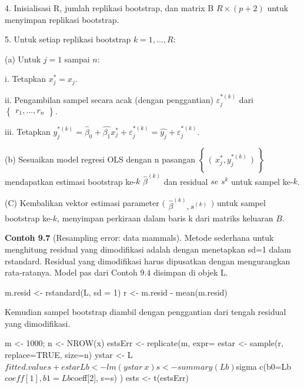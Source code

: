 \documentclass[a4paper,12pt]{article}
\theoremstyle{definition}
\begin{document}
4. Inisialisasi R, jumlah replikasi bootstrap, dan matrix B $R \times (p+2)$ untuk menyimpan replikasi bootstrap.

5. Untuk setiap replikasi bootstrap $k = 1,...,R:$ 

    (a) Untuk $j=1$ sampai $n:$ 
    
        i. Tetapkan $x_{j}^{*} = x_{j}.$
        
        ii. Pengambilan sampel secara acak (dengan penggantian) $\varepsilon _{j}^{*(k)}$ dari $\begin{Bmatrix}
        r_{1},...,r_{n}
        \end{Bmatrix}.$

        iii. Tetapkan $y_{j}^{*(k)} = \widehat{\beta }_{0} + \widehat{\beta _{1}}x_{j}^{*} + \varepsilon _{j}^{*(k)} =\widehat{y_{j}} + \varepsilon _{j}^{*(k)}.$ 

    (b) Sesuaikan model regresi OLS dengan n pasangan  
     $\begin{Bmatrix}
        \bigl(\begin{smallmatrix}
        x_{j}^{*}, y _{j}^{*(k)}
        \end{smallmatrix}\bigr)
    \end{Bmatrix}$
        mendapatkan estimasi bootstrap ke-$k$ $\widehat{\beta } ^{(k)}$ dan residual $se$ $s^{k}$ untuk sampel ke-$k$.

    (C) Kembalikan vektor estimasi parameter $\bigl(\begin{smallmatrix}
        \widehat{\beta }^{(k)}, s^{(k)}
        \end{smallmatrix}\bigr)$ 
        untuk sampel bootstrap ke-$k$, menyimpan perkiraan dalam baris k dari matriks keluaran $B$.

\textbf{Contoh 9.7} (Resampling error: data mammals). Metode sederhana untuk menghitung residual yang dimodifikasi adalah dengan menetapkan sd=1 dalam rstandard. Residual yang dimodifikasi harus dipusatkan dengan mengurangkan rata-ratanya. Model pas dari Contoh 9.4 disimpan di objek L.

\begin{spverbatim}
  m.resid <- rstandard(L, sd = 1)
  r <- m.resid - mean(m.resid)

\end{spverbatim}

Kemudian sampel bootstrap diambil dengan penggantian dari tengah residual yang dimodifikasi.

\begin{spverbatim}
    m <- 1000; n <- NROW(x)
    estsErr <- replicate(m, expr={
    estar <- sample(r, replace=TRUE, size=n)
    ystar <- L$fitted.values + estar
    Lb <- lm(ystar ~ x)
    s <- summary(Lb)$sigma
    c(b0=Lb$coeff[1], b1=Lb$coeff[2], s=s)
})
ests <- t(estsErr)

\end{spverbatim}
\end{document}
